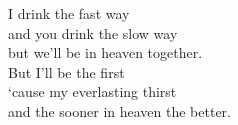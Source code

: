 
            I drink the fast way \\
            and you drink the slow way \\
            but we’ll be in heaven together. \\
            But I’ll be the first \\
            ‘cause my everlasting thirst \\
            and the sooner in heaven the better. \\
